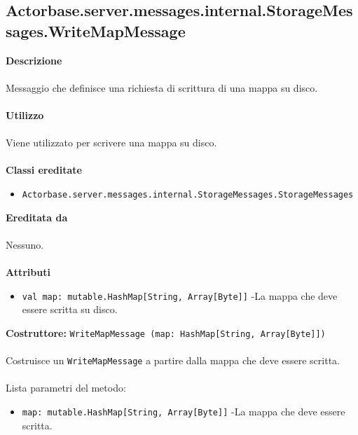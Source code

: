 \documentclass[a4paper]{article}
\begin{document}
	\subsection{Actorbase.server.messages.internal.StorageMessages.WriteMapMessage}
		\textbf{Descrizione}
			\\ \\
			Messaggio che definisce una richiesta di scrittura di una mappa su disco.
			\\ \\
		\textbf{Utilizzo}
			\\ \\
			Viene utilizzato per scrivere una mappa su disco.
			\\ \\
		\textbf{Classi ereditate}
			\begin{itemize}
				\item \texttt{Actorbase.server.messages.internal.StorageMessages.StorageMessages}
			\end{itemize}
		\textbf{Ereditata da}
			\\ \\
			Nessuno.
			\\ \\
		\textbf{Attributi}
			\begin{itemize}
				\item \texttt{val map: mutable.HashMap[String, Array[Byte]]} -La mappa che deve essere scritta su disco.
			\end{itemize}
		\textbf{Costruttore:} \texttt{WriteMapMessage (map: HashMap[String, Array[Byte]])}
		\\ \\
		Costruisce un \texttt{WriteMapMessage} a partire dalla mappa che deve essere scritta.
		\\ \\
		Lista parametri del metodo:
			\begin{itemize}
				\item \texttt{map: mutable.HashMap[String, Array[Byte]]} -La mappa che deve essere scritta.
			\end{itemize}
			
\end{document}
